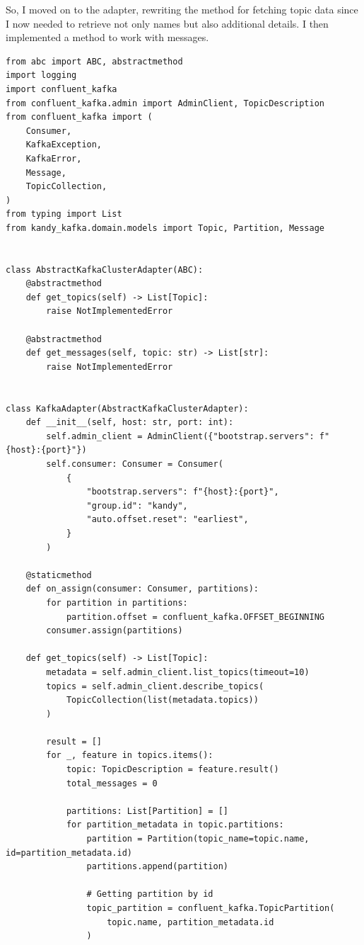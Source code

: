 \documentclass[10pt , a4paper]{report}
\newenvironment{code}{\captionsetup{type=listing}}{}
\begin{document}
So, I moved on to the adapter, rewriting the method for fetching topic data since I now needed to retrieve not only names but also additional details. I then implemented a method to work with messages.

\begin{code}
  \begin{verbatim}
from abc import ABC, abstractmethod
import logging
import confluent_kafka
from confluent_kafka.admin import AdminClient, TopicDescription
from confluent_kafka import (
    Consumer,
    KafkaException,
    KafkaError,
    Message,
    TopicCollection,
)
from typing import List
from kandy_kafka.domain.models import Topic, Partition, Message


class AbstractKafkaClusterAdapter(ABC):
    @abstractmethod
    def get_topics(self) -> List[Topic]:
        raise NotImplementedError

    @abstractmethod
    def get_messages(self, topic: str) -> List[str]:
        raise NotImplementedError


class KafkaAdapter(AbstractKafkaClusterAdapter):
    def __init__(self, host: str, port: int):
        self.admin_client = AdminClient({"bootstrap.servers": f"{host}:{port}"})
        self.consumer: Consumer = Consumer(
            {
                "bootstrap.servers": f"{host}:{port}",
                "group.id": "kandy",
                "auto.offset.reset": "earliest",
            }
        )

    @staticmethod
    def on_assign(consumer: Consumer, partitions):
        for partition in partitions:
            partition.offset = confluent_kafka.OFFSET_BEGINNING
        consumer.assign(partitions)

    def get_topics(self) -> List[Topic]:
        metadata = self.admin_client.list_topics(timeout=10)
        topics = self.admin_client.describe_topics(
            TopicCollection(list(metadata.topics))
        )

        result = []
        for _, feature in topics.items():
            topic: TopicDescription = feature.result()
            total_messages = 0

            partitions: List[Partition] = []
            for partition_metadata in topic.partitions:
                partition = Partition(topic_name=topic.name, id=partition_metadata.id)
                partitions.append(partition)

                # Getting partition by id
                topic_partition = confluent_kafka.TopicPartition(
                    topic.name, partition_metadata.id
                )


\end{verbatim}
\end{code}
\end{document}

